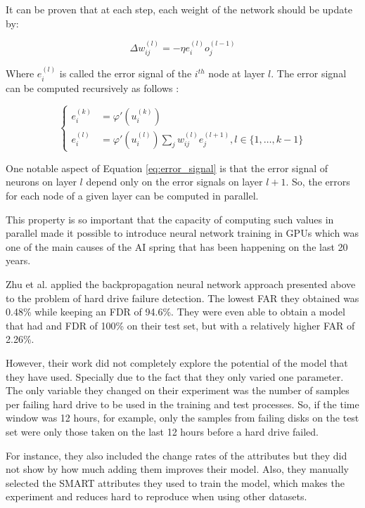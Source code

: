 It can be proven \cite{amari1993backpropagation} that at each step, each weight of the network should be update by:

$$
\Delta w_{ij}^{(l)} = -\eta e_i^{(l)} o_{j}^{(l-1)}
$$

Where $e_i^{(l)}$ is called the error signal of the $i^{th}$ node at layer $l$.
The error signal can be computed recursively as follows \cite{amari1993backpropagation}:

\begin{equation}\label{eq:error_signal}
\begin{cases}
    e_i^{(k)} &= \varphi '(u_i^{(k)}) \\
    e_i^{(l)} &= \varphi '(u_i^{(l)}) \sum_j w_{ij}^{(l)}e_j^{(l+1)}, l \in \{1,\dots,k-1\}
\end{cases}
\end{equation}

One notable aspect of Equation \ref{eq:error_signal} is that the error signal of neurons on layer $l$ depend only on the error signals on layer $l+1$.
So, the errors for each node of a given layer can be computed in parallel.

This property is so important that the capacity of computing such values in parallel made it possible to introduce neural network training in GPUs \cite{steinkraus2005using} which was one of the main causes of the AI spring that has been happening on the last 20 years.

Zhu et al. \cite{Zhu13} applied the backpropagation neural network approach presented above to the problem of hard drive failure detection.
The lowest FAR they obtained was 0.48\% while keeping an FDR of 94.6\%.
They were even able to obtain a model that had and FDR of 100\% on their test set, but with a relatively higher FAR of 2.26\%.

However, their work did not completely explore the potential of the model that they have used.
Specially due to the fact that they only varied one parameter.
The only variable they changed on their experiment was the number of samples per failing hard drive to be used in the training and test processes.
So, if the time window was 12 hours, for example, only the samples from failing disks on the test set were only those taken on the last 12 hours before a hard drive failed.

For instance, they also included the change rates of the attributes but they did not show by how much adding them improves their model.
Also, they manually selected the SMART attributes they used to train the model, which makes the experiment and reduces hard to reproduce when using other datasets.

